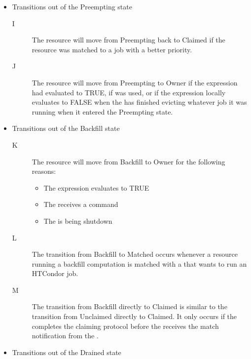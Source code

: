 \begin{itemize}
\begin{description}
\end{description}


\item Transitions out of the Preempting state

\begin{description}

\item[I] The resource will move from Preempting back to Claimed if the
  resource was matched to a job with a better priority.

\item[J] The resource will move from Preempting to Owner if the
   expression had evaluated to TRUE, if 
  was used, or if the  expression locally evaluates to
  FALSE when the  has finished evicting whatever job it
  was running when it entered the Preempting state.

\end{description}


\item Transitions out of the Backfill state

\begin{description}

\item[K] The resource will move from Backfill to Owner for the
  following reasons:
  \begin{itemize}
  \item The  expression evaluates to TRUE
  \item The  receives a  command
  \item The  is being shutdown
  \end{itemize}
 
\item[L] The transition from Backfill to Matched occurs whenever a
  resource running a backfill computation is matched with a
   that wants to run an HTCondor job.

\item[M] The transition from Backfill directly to Claimed is similar
  to the transition from Unclaimed directly to Claimed.
  It only occurs if the  completes the claiming
  protocol before the  receives the match notification
  from the .

\end{description}

\item Transitions out of the Drained state


\end{itemize}
